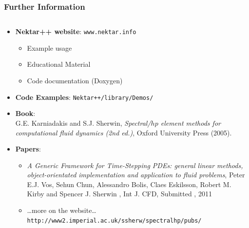 \documentclass{beamer}
\numberwithin{figure}{section}
\numberwithin{equation}{section}
\begin{document}
\begin{frame}[fragile]
\frametitle{Further Information}
\begin{minipage}[c][0.8\textheight][t]{\linewidth}
\begin{columns}
\begin{column}[l]{11.5cm}
\begin{itemize} 
    \item \textbf{Nektar++ website}: \texttt{www.nektar.info}
    \begin{itemize}
      \item Example usage
      \item Educational Material
      \item Code documentation (Doxygen)
    \end{itemize}
    \item \textbf{Code Examples}: \texttt{Nektar++/library/Demos/}
    \item \textbf{Book}: \\
    {\scriptsize G.E. Karniadakis and S.J. Sherwin,
    \emph{Spectral/$hp$ element methods for computational fluid dynamics (2nd
    ed.)}, Oxford University Press (2005).}
    \item \textbf{Papers}:
    \begin{itemize}
      \item {\scriptsize\emph{A Generic Framework for Time-Stepping PDEs:
      general linear methods, object-orientated implementation and application
      to fluid problems}, Peter E.J. Vos, Sehun Chun, Alessandro Bolis, Claes
      Eskilsson, Robert M. Kirby and Spencer J. Sherwin , Int J. CFD, Submitted
      , 2011}
      \item {\scriptsize \ldots more on the website\ldots}\\
      {\scriptsize \texttt{http://www2.imperial.ac.uk/ssherw/spectralhp/pubs/}}
    \end{itemize}
\end{itemize}
\end{column}
\end{columns}
\end{minipage}
\end{frame}
\end{document}
